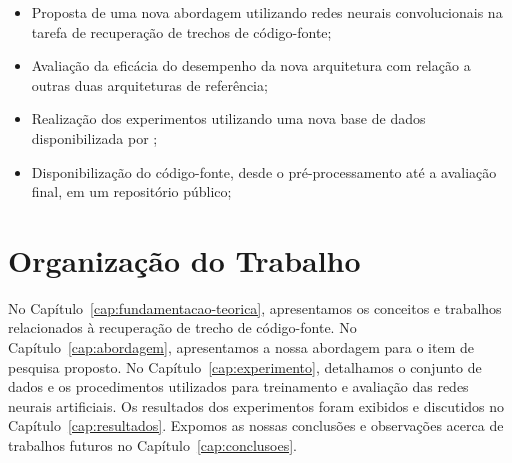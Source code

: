 \begin{itemize}
\item Proposta de uma nova abordagem utilizando redes neurais convolucionais na tarefa de recuperação de trechos de código-fonte;
\item Avaliação da eficácia do desempenho da nova arquitetura com relação a outras duas arquiteturas de referência;
\item Realização dos experimentos utilizando uma nova base de dados disponibilizada por \cite{yao-2018};
\item Disponibilização do código-fonte, desde o pré-processamento até a avaliação final, em um repositório público;
\end{itemize}

\section{Organização do Trabalho}
\label{sec:organizacao_trabalho}

No Capítulo~\ref{cap:fundamentacao-teorica}, apresentamos os conceitos e trabalhos relacionados à recuperação de trecho de código-fonte. No Capítulo~\ref{cap:abordagem}, apresentamos a nossa abordagem para o item de pesquisa proposto. No Capítulo~\ref{cap:experimento}, detalhamos o conjunto de dados e os procedimentos utilizados para treinamento e avaliação das redes neurais artificiais. Os resultados dos experimentos foram exibidos e discutidos no Capítulo~\ref{cap:resultados}. Expomos as nossas conclusões e observações acerca de trabalhos futuros no Capítulo~\ref{cap:conclusoes}.